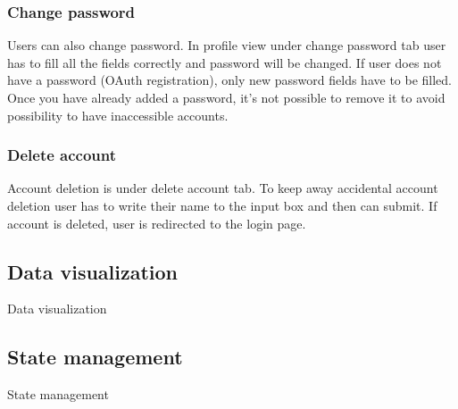 \subsubsection{Change password}\label{subsubsec:change-password}
Users can also change password.
In profile view under change password tab user has to fill all the fields correctly and password will be changed.
If user does not have a password (OAuth registration), only new password fields have to be filled.
Once you have already added a password, it's not possible to remove it to avoid possibility to have inaccessible accounts.

\subsubsection{Delete account}\label{subsubsec:delete-account}
Account deletion is under delete account tab.
To keep away accidental account deletion user has to write their name to the input box and then can submit.
If account is deleted, user is redirected to the login page.


\subsection{Data visualization}\label{subsec:data-visualization}
Data visualization

\subsection{State management}\label{subsec:state-management-content}
State management
